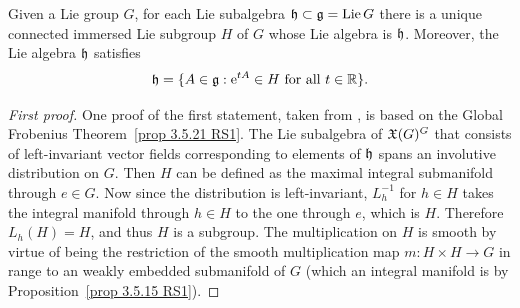\begin{thm}\label{thm analytic subgroup}
    Given a Lie group $G$, for each Lie subalgebra $\mathfrak{h}\subset \mathfrak{g}=\operatorname{Lie} G$ there is a unique connected immersed Lie subgroup $H$ of $G$ whose Lie algebra is $\mathfrak{h}$. Moreover, the Lie algebra $\mathfrak{h}$ satisfies
    \[\mathfrak{h}=\{A\in\mathfrak{g}: \mathrm{e}^{tA}\in H\text{ for all }t\in\mathbb{R}\}.\]
\end{thm}
\begin{proof}[First proof]
    One proof of the first statement, taken from \cite[Prop.~5.6.5]{RS1}, is based on the Global Frobenius Theorem~\ref{prop 3.5.21 RS1}. The Lie subalgebra of $\mathfrak{X}(G)^G$ that consists of left-invariant vector fields corresponding to elements of $\mathfrak{h}$ spans an involutive distribution on $G$. Then $H$ can be defined as the maximal integral submanifold through $e\in G$. Now since the distribution is left-invariant, $L_h^{-1}$ for $h\in H$ takes the integral manifold through $h\in H$ to the one through $e$, which is $H$. Therefore $L_h(H)=H$, and thus $H$ is a subgroup. The multiplication on $H$ is smooth by virtue of being the restriction of the smooth multiplication map $m:H\times H\to G$ in range to an weakly embedded submanifold of $G$ (which an integral manifold is by Proposition~\ref{prop 3.5.15 RS1}).
\end{proof}
